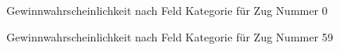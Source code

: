 \begin{figure}[ht]
\centering
{}
\caption{Gewinnwahrscheinlichkeit nach Feld Kategorie für Zug Nummer 0}
\label{fig:win-pro-turn-0}
\end{figure}
\begin{figure}[ht]
\centering
{}
\caption{Gewinnwahrscheinlichkeit nach Feld Kategorie für Zug Nummer 59}
\label{fig:win-pro-turn-59}
\end{figure}